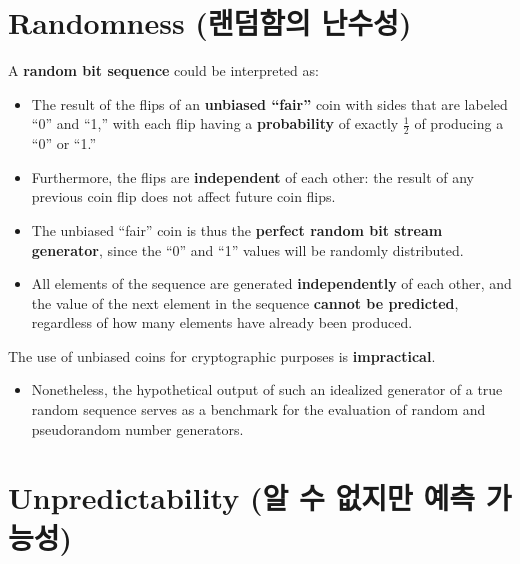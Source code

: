 \documentclass[12pt,openany]{book}
\theoremstyle{definition}
\begin{document}
\section*{Randomness (랜덤함의 난수성)}

A \textbf{random bit sequence} could be interpreted as:
\begin{itemize}
	\item The result of the flips of an \textbf{unbiased ``fair''} coin with sides that are labeled ``0'' and ``1,'' with each flip having a \textbf{probability} of exactly \( \frac{1}{2} \) of producing a ``0'' or ``1.''
	\item Furthermore, the flips are \textbf{independent} of each other: the result of any previous coin flip does not affect future coin flips.
	\item The unbiased ``fair'' coin is thus the \textbf{perfect random bit stream generator}, since the ``0'' and ``1'' values will be randomly distributed.
	\item All elements of the sequence are generated \textbf{independently} of each other, and the value of the next element in the sequence \textbf{cannot be predicted}, regardless of how many elements have already been produced.
\end{itemize}
The use of unbiased coins for cryptographic purposes is \textbf{impractical}.
\begin{itemize}
	\item Nonetheless, the hypothetical output of such an idealized generator of a true random sequence serves as a benchmark for the evaluation of random and pseudorandom number generators.
\end{itemize}

\section*{Unpredictability (알 수 없지만 예측 가능성)}
\end{document}
